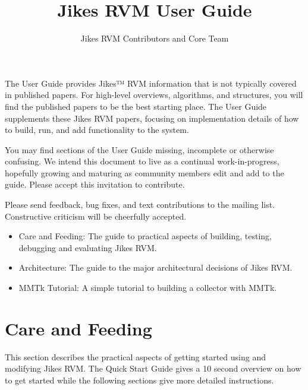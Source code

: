 \documentclass[a4paper]{book}
\title{Jikes RVM User Guide}
\author{Jikes RVM Contributors and Core Team}
\begin{document}
\maketitle


The User Guide provides Jikes™ RVM information that is not typically covered in published papers. For high-level overviews, algorithms, and structures, you will find the published papers to be the best starting place. The User Guide supplements these Jikes RVM papers, focusing on implementation details of how to build, run, and add functionality to the system.

You may find sections of the User Guide missing, incomplete or otherwise confusing. We intend this document to live as a continual work-in-progress, hopefully growing and maturing as community members edit and add to the guide. Please accept this invitation to contribute.

Please send feedback, bug fixes, and text contributions to the mailing list. Constructive criticism will be cheerfully accepted.

\begin{itemize}
  \item Care and Feeding: The guide to practical aspects of building, testing, debugging and evaluating Jikes RVM.
  \item Architecture: The guide to the major architectural decisions of Jikes RVM.
  \item MMTk Tutorial: A simple tutorial to building a collector with MMTk.
\end{itemize}

\chapter{Care and Feeding}
\label{cha:careandfeeding}

This section describes the practical aspects of getting started using and modifying Jikes RVM. The Quick Start Guide gives a 10 second overview on how to get started while the following sections give more detailed instructions.




\end{document}
